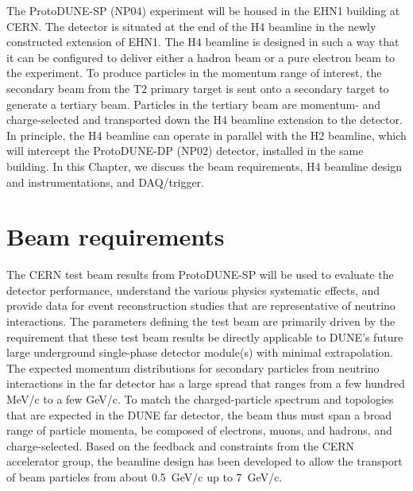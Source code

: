 The ProtoDUNE-SP (NP04) experiment will be housed in the EHN1 building at CERN. The detector is situated at the end of the H4 beamline in the newly constructed extension of EHN1. The H4 beamline is designed in such a way that it can be configured to deliver either a hadron beam or a pure electron beam to the experiment. To produce particles in the momentum range of interest, the secondary beam from the T2 primary target is sent onto a secondary target to generate a tertiary beam. Particles in the tertiary beam are momentum- and charge-selected and transported down the H4 beamline extension to the detector. 
In principle, the H4 beamline can operate in parallel with the H2 beamline, which will intercept the ProtoDUNE-DP (NP02) detector, installed in the same building. In this Chapter, we discuss the beam requirements, H4 beamline design and instrumentations, and DAQ/trigger.  

\section{Beam requirements}
\label{sec:beamrequirements}

The CERN test beam results from ProtoDUNE-SP will be used to evaluate the detector performance,  understand the various physics systematic effects, and provide data for event reconstruction studies that are representative of neutrino interactions. 
The parameters defining the test beam are primarily driven by the requirement that these test beam results be directly applicable to DUNE's future large underground single-phase detector module(s) with minimal extrapolation.
The expected momentum distributions for secondary particles from neutrino interactions in the far detector has a large spread that ranges from a few hundred MeV/c to a few GeV/c.
To match the charged-particle spectrum and topologies that are expected in the DUNE far detector, the beam thus must span a broad range of particle momenta, be composed of electrons, muons, and hadrons, and charge-selected. 
Based on the feedback and constraints from the CERN accelerator group, the beamline design has been developed to allow the transport of beam particles from about 0.5~GeV/c up to 7~GeV/c. 

